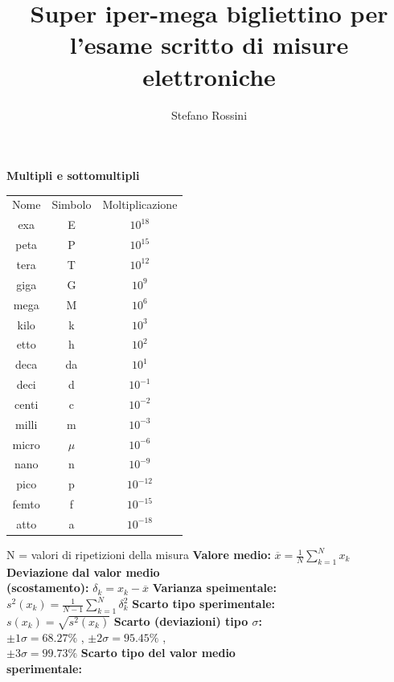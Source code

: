\documentclass{article}
\title{Super iper-mega bigliettino per l'esame scritto di misure elettroniche}
\author{Stefano Rossini}
\begin{document}
\begin{multicols*}{3}
    \textbf{Multipli e sottomultipli} \newline
    \begin{tabular}{c c c}
        Nome & Simbolo & Moltiplicazione \\
        exa & E & $10^{18}$ \\
        peta & P & $10^{15}$ \\
        tera & T & $10^{12}$ \\
        giga & G & $10^{9}$ \\
        mega & M & $10^{6}$ \\
        kilo & k & $10^{3}$ \\
        etto & h & $10^{2}$ \\
        deca & da & $10^{1}$ \\
        deci & d & $10^{-1}$ \\
        centi & c & $10^{-2}$ \\
        milli & m & $10^{-3}$ \\
        micro & $\mu$ & $10^{-6}$ \\
        nano & n & $10^{-9}$ \\
        pico & p & $10^{-12}$ \\
        femto & f & $10^{-15}$ \\
        atto & a & $10^{-18}$
    \end{tabular}
    \newline 
    N = valori di ripetizioni della misura  \newline 
    \textbf{Valore medio:}  
    $\overline{x} = \frac{1}{N} \sum_{k=1}^{N} x_k$ \newline
    \textbf{Deviazione dal valor medio \\ (scostamento):}
    $\delta_k = x_k - \overline{x}$ \newline
    \textbf{Varianza speimentale:} \\
    $s^{2}(x_k) = \frac{1}{N-1} \sum_{k =1}^{N} \delta_k ^{2}$ \newline 
    \textbf{Scarto tipo sperimentale:}\\
    $s(x_k) = \sqrt{s^{2} (x_k)}$ \newline 
    \textbf{Scarto (deviazioni) tipo $\sigma$:}\\
    $\pm 1 \sigma = 68.27 \%$ , $\pm 2 \sigma = 95.45 \%$ , \\ 
    $\pm 3 \sigma = 99.73 \%$ \newline
    \textbf{Scarto tipo del valor medio \\ sperimentale:} \\ 

\end{multicols*}
\end{document}
